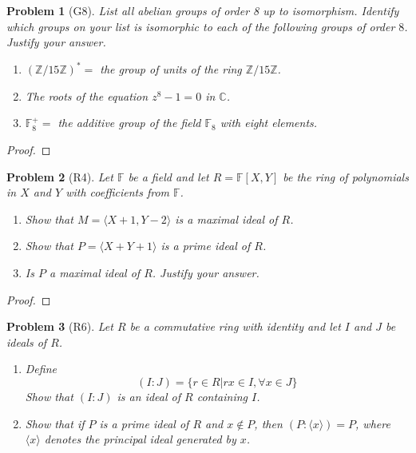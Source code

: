 \documentclass[10pt]{article}
\newcommand{\sk}{\vskip 10mm}
\newcommand{\bb}[1]{\mathbb{#1}}
\theoremstyle{plain}
\newtheorem{problem}{Problem}
\theoremstyle{remark}
\begin{document}
\sk


\begin{problem}[G8]
  List all abelian groups of order 8 up to isomorphism. Identify which groups on
  your list is isomorphic to each of the following groups of order $8$. Justify
  your answer.
  \begin{enumerate}
  \item $(\bb{Z}/15\bb{Z})^*=$ the group of units of the ring $\bb{Z}/15\bb{Z}$.
  \item The roots of the equation $z^8-1=0$ in $\bb{C}$.
  \item $\bb{F}_8^+=$ the additive group of the field $\bb{F}_8$ with
    eight elements.
  \end{enumerate}
\end{problem}

\begin{proof}
  
\end{proof}

\sk


\begin{problem}[R4]
  Let $\bb{F}$ be a field and let $R=\bb{F}[X,Y]$ be the ring of polynomials
  in $X$ and $Y$ with coefficients from $\bb{F}$.
  \begin{enumerate}
  \item Show that $M=\langle X+1,Y-2\rangle$ is a maximal ideal of $R$.
  \item Show that $P=\langle X+Y+1\rangle$ is a prime ideal of $R$.
  \item Is $P$ a maximal ideal of $R$. Justify your answer.
  \end{enumerate}
\end{problem}

\begin{proof}
  
\end{proof}

\sk


\begin{problem}[R6]
  Let $R$ be a commutative ring with identity and let $I$ and $J$
  be ideals of $R$.
  \begin{enumerate}
  \item Define
    \[ (I:J)=\{r\in R|rx\in I, \forall x\in J\} \]
    Show that $(I:J)$ is an ideal of $R$ containing $I$.
  \item Show that if $P$ is a prime ideal of $R$ and $x\notin P$,
    then $(P:\langle x\rangle)=P$, where $\langle x\rangle$ denotes the
    principal ideal generated by $x$.
  \end{enumerate}
\end{problem}
\end{document}
